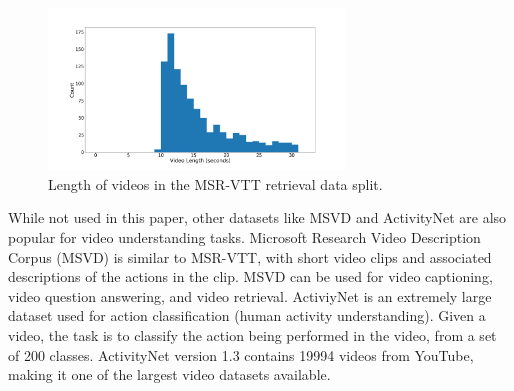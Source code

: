 \begin{figure}
      \centering
      \includegraphics[width=0.7\textwidth]{figures/msr-vtt-length-histogram.png}
      \caption{Length of videos in the MSR-VTT retrieval data split.}
      \label{fig:length_histogram}
\end{figure}

While not used in this paper, other datasets like MSVD \cite{msvd} and ActivityNet \cite{activitynet} are also popular for video understanding tasks.
Microsoft Research Video Description Corpus (MSVD) is similar to MSR-VTT, with short video clips and associated descriptions of the actions in the clip.
MSVD can be used for video captioning, video question answering, and video retrieval.
ActiviyNet is an extremely large dataset used for action classification (human activity understanding).
Given a video, the task is to classify the action being performed in the video, from a set of 200 classes.
ActivityNet version 1.3 contains 19994 videos from YouTube, making it one of the largest video datasets available.
